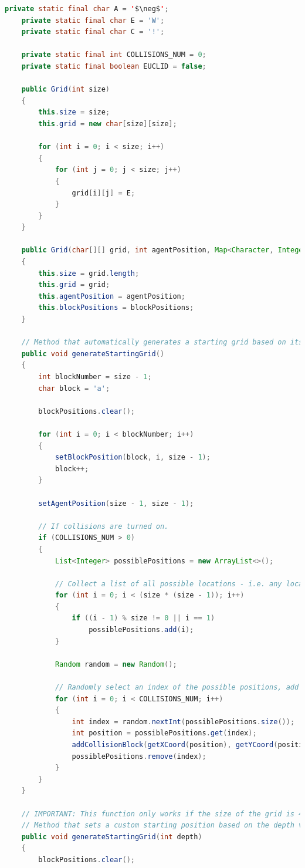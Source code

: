 \documentclass{article}
\begin{document}
\begin{appendices}
\begin{lstlisting}[language=Java,mathescape=true]
	private static final char A = '$\neg$';
	private static final char E = 'W';
	private static final char C = '!';
	
	private static final int COLLISIONS_NUM = 0;
	private static final boolean EUCLID = false;
	
	public Grid(int size)
	{
		this.size = size;
		this.grid = new char[size][size];
	
		for (int i = 0; i < size; i++)
		{
			for (int j = 0; j < size; j++)
			{
				grid[i][j] = E;
			}
		}
	}

	public Grid(char[][] grid, int agentPosition, Map<Character, Integer> blockPositions)
	{
		this.size = grid.length;
		this.grid = grid;
		this.agentPosition = agentPosition;
		this.blockPositions = blockPositions;
	}

	// Method that automatically generates a starting grid based on its size.
	public void generateStartingGrid()
	{
		int blockNumber = size - 1;
		char block = 'a';

		blockPositions.clear();

		for (int i = 0; i < blockNumber; i++)
		{
			setBlockPosition(block, i, size - 1);
			block++;
		}

		setAgentPosition(size - 1, size - 1);

		// If collisions are turned on.
		if (COLLISIONS_NUM > 0)
		{
			List<Integer> possiblePositions = new ArrayList<>();

			// Collect a list of all possible locations - i.e. any location that is not needed for the agent and blocks in the start state, or the blocks in the solution state.
			for (int i = 0; i < (size * (size - 1)); i++)
			{
				if ((i - 1) % size != 0 || i == 1)
					possiblePositions.add(i);
			}

			Random random = new Random();

			// Randomly select an index of the possible positions, add the collision block, and then remove it from the index.
			for (int i = 0; i < COLLISIONS_NUM; i++)
			{
				int index = random.nextInt(possiblePositions.size());
				int position = possiblePositions.get(index);
				addCollisionBlock(getXCoord(position), getYCoord(position));
				possiblePositions.remove(index);
			}
		}
	}

	// IMPORTANT: This function only works if the size of the grid is 4x4, i.e. size = 4.
	// Method that sets a custom starting position based on the depth value provided.
	public void generateStartingGrid(int depth)
	{
		blockPositions.clear();


\end{lstlisting}
\end{appendices}
\end{document}
